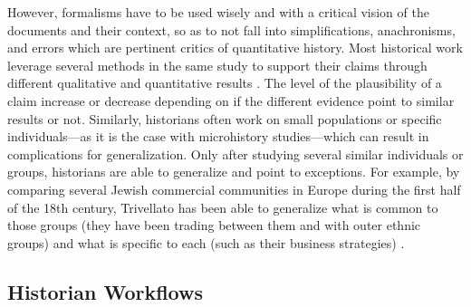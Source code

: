 However, formalisms have to be used wisely and with a critical vision of the documents and their context, so as to not fall into simplifications, anachronisms, and errors which are pertinent critics of quantitative history\cite{lemercierQuantitativeMethodsHumanities2019, lemercierBackSourcesPracticing2021}.
Most historical work leverage several methods in the same study to support their claims through different qualitative and quantitative results \cite{petzCombiningNetworkResearch2022}.
The level of the plausibility of a claim increase or decrease depending on if the different evidence point to similar results or not.
Similarly, historians often work on small populations or specific individuals---as it is the case with microhistory studies\cite{ginzburgMicrohistoire1981}---which can result in complications for generalization.
Only after studying several similar individuals or groups, historians are able to generalize and point to exceptions.
For example, by comparing several Jewish commercial communities in Europe during the first half of the 18th century, Trivellato has been able to generalize what is common to those groups (they have been trading between them and with outer ethnic groups) and what is specific to each (such as their business strategies) \cite{trivellatoThereFutureItalian2011}.





\subsection{Historian Workflows}

